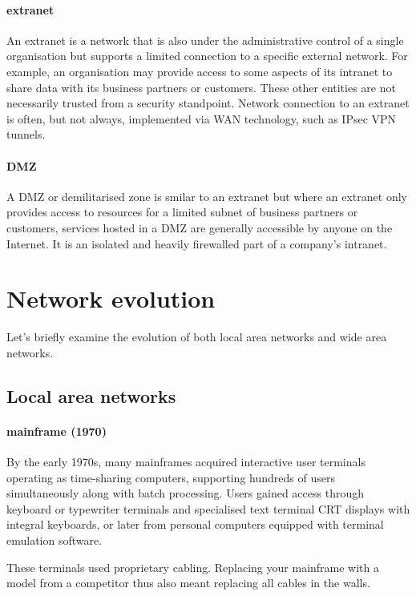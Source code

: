 {\paragraph{extranet}
An extranet is a network that is also under the administrative control of a single organisation but supports a limited connection to a specific external network.
For example, an organisation may provide access to some aspects of its intranet to share data with its business partners or customers.
These other entities are not necessarily trusted from a security standpoint.
Network connection to an extranet is often, but not always, implemented via WAN technology, such as IPsec VPN tunnels.

\paragraph{DMZ}
A DMZ or demilitarised zone is smilar to an extranet but where an extranet only provides access to resources for a limited subnet of business partners or customers, services hosted in a DMZ are generally accessible by anyone on the Internet.
It is an isolated and heavily firewalled part of a company's intranet.

\section{Network evolution}
\label{sec:network-evolution}

Let's briefly examine the evolution of both local area networks and wide area networks.

\subsection{Local area networks}
\label{sec:network-evolution-lan}

\paragraph{mainframe (1970)}
By the early 1970s, many mainframes acquired interactive user terminals operating as time-sharing computers, supporting hundreds of users simultaneously along with batch processing.
Users gained access through keyboard or typewriter terminals and specialised text terminal CRT displays with integral keyboards, or later from personal computers equipped with terminal emulation software.

These terminals used proprietary cabling.
Replacing your mainframe with a model from a competitor thus also meant replacing all cables in the walls.
    
}
